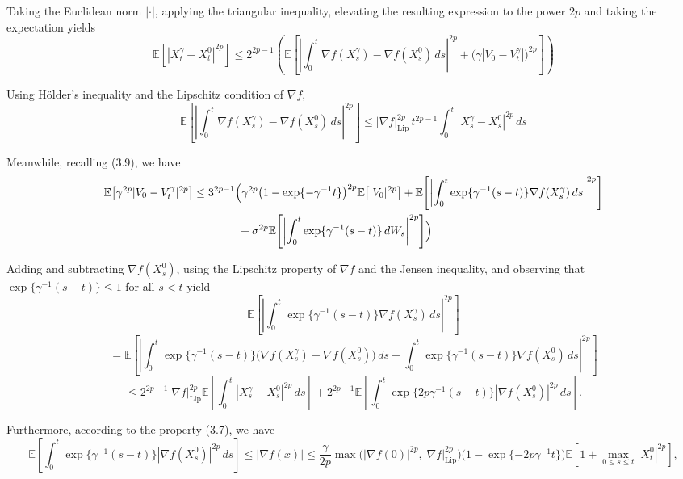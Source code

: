 \documentclass[11pt]{article}
\theoremstyle{remark}
\begin{document}
Taking the Euclidean norm $|\cdot|$, applying the triangular inequality, elevating the resulting expression to the power $2p$ and taking the expectation yields
\begin{equation}
\mathbb{E}\!\left[|X_t^\gamma-X_t^0|^{2p}\right]\le 2^{2p-1}\left(\mathbb{E}\!\left[\left|\int_0^t \nabla f(X_s^\gamma)-\nabla f(X_s^0)\,ds\right|^{2p}+\bigl(\gamma|V_0-V_t^\gamma|\bigr)^{2p}\right]\right)
\tag{3.11}
\end{equation}

Using H\"older's inequality and the Lipschitz condition of $\nabla f$,
\[
\mathbb{E}\!\left[\left|\int_0^t \nabla f(X_s^\gamma)-\nabla f(X_s^0)\,ds\right|^{2p}\right]\le |\nabla f|_{\mathrm{Lip}}^{2p}\,t^{2p-1}\int_0^t \left|X_s^\gamma-X_s^0\right|^{2p}\,ds
\]

Meanwhile, recalling (3.9), we have
\[
\begin{aligned}
\mathbb{E}\!\left[\gamma^{2p}|V_0-V_t^\gamma|^{2p}\right]
&\le 3^{2p-1}\Bigl(\gamma^{2p}\bigl(1-\exp\{-\gamma^{-1}t\}\bigr)^{2p}\mathbb{E}\!\left[|V_0|^{2p}\right]+\mathbb{E}\!\left[\left|\int_0^t \exp\{\gamma^{-1}(s-t)\}\nabla f(X_s^\gamma)\,ds\right|^{2p}\right] \\
&\qquad\qquad +\sigma^{2p}\mathbb{E}\!\left[\left|\int_0^t \exp\{\gamma^{-1}(s-t)\}\,dW_s\right|^{2p}\right]\Bigr)
\end{aligned}
\]


Adding and subtracting $\nabla f(X_s^0)$, using the Lipschitz property of $\nabla f$ and the Jensen inequality, and observing that $\exp\{\gamma^{-1}(s-t)\}\le 1$ for all $s<t$ yield
\[
\mathbb{E}\!\left[\left|\int_0^t \exp\{\gamma^{-1}(s-t)\}\nabla f(X_s^\gamma)\,ds\right|^{2p}\right]
\]
\[
=\mathbb{E}\!\left[\left|\int_0^t \exp\{\gamma^{-1}(s-t)\}\big(\nabla f(X_s^\gamma)-\nabla f(X_s^0)\big)\,ds+\int_0^t \exp\{\gamma^{-1}(s-t)\}\nabla f(X_s^0)\,ds\right|^{2p}\right]
\]
\[
\le 2^{2p-1}|\nabla f|_{\mathrm{Lip}}^{2p}\mathbb{E}\!\left[\int_0^t |X_s^\gamma-X_s^0|^{2p}\,ds\right]+2^{2p-1}\mathbb{E}\!\left[\int_0^t \exp\{2p\gamma^{-1}(s-t)\}|\nabla f(X_s^0)|^{2p}\,ds\right].
\]

Furthermore, according to the property (3.7), we have
\[
\mathbb{E}\!\left[\int_0^t \exp\{\gamma^{-1}(s-t)\}|\nabla f(X_s^0)|^{2p}\,ds\right]
\le |\nabla f(x)| \le \frac{\gamma}{2p}\max\bigl(|\nabla f(0)|^{2p},|\nabla f|_{\mathrm{Lip}}^{2p}\bigr)\bigl(1-\exp\{-2p\gamma^{-1}t\}\bigr)\mathbb{E}\!\left[1+\max_{0\le s\le t}|X_t^0|^{2p}\right],
\]
\end{document}
